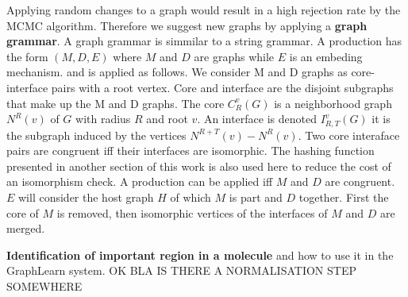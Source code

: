 \documentclass{article}
\begin{document}
Applying random changes to a graph would result in a high rejection rate by the MCMC 
algorithm. Therefore we suggest new graphs by applying a \textbf{graph grammar}. 
A graph grammar is simmilar to a string grammar. A production has the form $(M,D,E)$ 
where $M$ and $D$ are graphs while $E$ is an embeding mechanism.
and is applied as follows. 
We consider M and D graphs as core-interface pairs with a root vertex. 
Core and interface are the disjoint subgraphs that make up the M and D graphs. 
The core $C^v_R(G)$ is a neighborhood graph $N^R(v)$ of $G$ with radius $R$ and root $v$.
An interface is denoted $I^v_{R,T}(G)$ it is the subgraph induced by the vertices $N^{R+T}(v) - 
N^{R}(v)$. Two core interaface pairs are congruent iff 
their interfaces are isomorphic. The hashing function presented in another section 
of this work is also used here to reduce the cost of an isomorphism check. 
A production can be applied iff $M$ and $D$ are congruent. $E$ will consider the 
host graph $H$ of which $M$ is part and $D$ together. First the core of $M$ is removed,
then isomorphic vertices of the interfaces of $M$ and $D$ are merged.


\textbf{Identification of important region in a molecule} and how to use it in the GraphLearn
system. OK BLA IS THERE A NORMALISATION STEP SOMEWHERE
\end{document}

